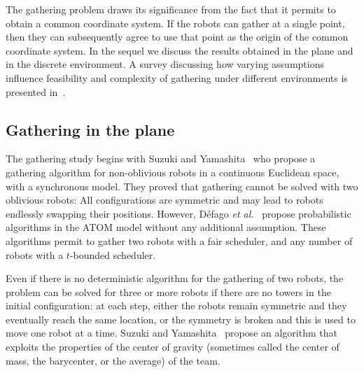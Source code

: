 The gathering problem draws its significance from the fact that it permits to obtain a common coordinate system.
 If  the robots can gather at a single point, then they can subsequently agree to use that point as the origin of the common coordinate system. %
 In the sequel we discuss the results obtained in the plane and in the discrete environment.
A survey discussing how varying assumptions influence feasibility and complexity of gathering under different environments is presented in~\cite{Pelc11}.


\subsection{Gathering in the plane}
The gathering study begins with Suzuki and Yamashita~\cite{suzuki_distributed_1999} who propose a gathering algorithm for 
non-oblivious robots in a continuous Euclidean space, with a synchronous model. They proved that gathering cannot be solved with two oblivious robots: All configurations are symmetric and may lead to robots endlessly swapping their positions. 
However, Défago \textit{et al.}~\cite{DefagoGMP06} propose probabilistic algorithms in the ATOM model without any additional assumption.
These algorithms permit to gather two robots with a fair scheduler, and any number of robots with a $t$-bounded scheduler.

Even if there is no deterministic algorithm for the gathering of two robots,  the problem can be solved for three or more robots if there are no towers in the initial configuration: at each step, either the robots remain symmetric and they eventually reach the same location, or the symmetry is broken and this is used to move one robot at a time. Suzuki and Yamashita~\cite{suzuki_distributed_1999} propose an algorithm that exploits the properties of the center of gravity (sometimes called the center of mass, the barycenter, or the average) of the team.

